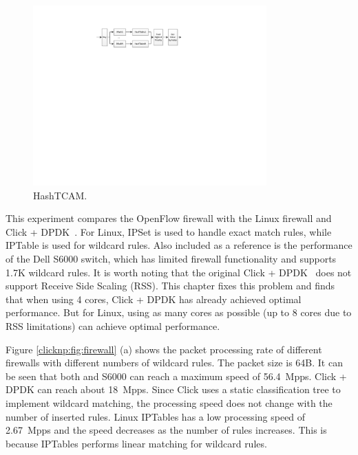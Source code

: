 \begin{figure}[htbp]
	\centering
	\includegraphics[width=0.8\textwidth]{image/HashTCAM}
	\caption{HashTCAM.}
	\label{clicknp:fig:hashtcam}
\end{figure}

This experiment compares the OpenFlow firewall with the Linux firewall and Click + DPDK~\cite{barbette2015fast}. For Linux, IPSet is used to handle exact match rules, while IPTable is used for wildcard rules. Also included as a reference is the performance of the Dell S6000 switch, which has limited firewall functionality and supports 1.7K wildcard rules. It is worth noting that the original Click + DPDK~\cite{barbette2015fast} does not support Receive Side Scaling (RSS). This chapter fixes this problem and finds that when using 4 cores, Click + DPDK has already achieved optimal performance. But for Linux, using as many cores as possible (up to 8 cores due to RSS limitations) can achieve optimal performance.

Figure \ref {clicknp:fig:firewall} (a) shows the packet processing rate of different firewalls with different numbers of wildcard rules. The packet size is 64B. It can be seen that both \name and S6000 can reach a maximum speed of 56.4~Mpps. Click + DPDK can reach about 18~Mpps. Since Click uses a static classification tree to implement wildcard matching, the processing speed does not change with the number of inserted rules. Linux IPTables has a low processing speed of 2.67~Mpps and the speed decreases as the number of rules increases. This is because IPTables performs linear matching for wildcard rules.

